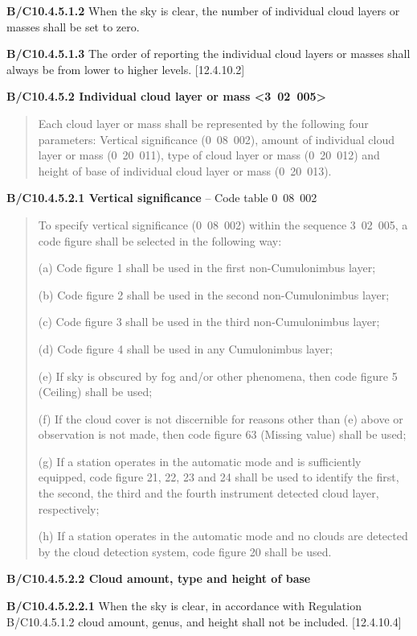 \textbf{B/C10.4.5.1.2} When the sky is clear, the number of individual cloud layers or masses shall be set to zero.

\textbf{B/C10.4.5.1.3} The order of reporting the individual cloud layers or masses shall always be from lower to higher levels. {[}12.4.10.2{]}

\textbf{B/C10.4.5.2 Individual cloud layer or mass \textless3~02~005\textgreater{}}

\begin{quote}
Each cloud layer or mass shall be represented by the following four parameters: Vertical significance (0~08~002), amount of individual cloud layer or mass (0~20~011), type of cloud layer or mass (0~20~012) and height of base of individual cloud layer or mass (0~20~013).
\end{quote}

\textbf{B/C10.4.5.2.1 Vertical significance} -- Code table 0~08~002

\begin{quote}
To specify vertical significance (0~08~002) within the sequence 3~02~005, a code figure shall be selected in the following way:

(a) Code figure 1 shall be used in the first non-Cumulonimbus layer;

(b) Code figure 2 shall be used in the second non-Cumulonimbus layer;

(c) Code figure 3 shall be used in the third non-Cumulonimbus layer;

(d) Code figure 4 shall be used in any Cumulonimbus layer;

(e) If sky is obscured by fog and/or other phenomena, then code figure 5 (Ceiling) shall be used;

(f) If the cloud cover is not discernible for reasons other than (e) above or observation is not made, then code figure 63 (Missing value) shall be used;

(g) If a station operates in the automatic mode and is sufficiently equipped, code figure 21, 22, 23 and 24 shall be used to identify the first, the second, the third and the fourth instrument detected cloud layer, respectively;

(h) If a station operates in the automatic mode and no clouds are detected by the cloud detection system, code figure 20 shall be used.
\end{quote}

\textbf{B/C10.4.5.2.2 Cloud amount, type and height of base}

\textbf{B/C10.4.5.2.2.1} When the sky is clear, in accordance with Regulation B/C10.4.5.1.2 cloud amount, genus, and height shall not be included. {[}12.4.10.4{]}

